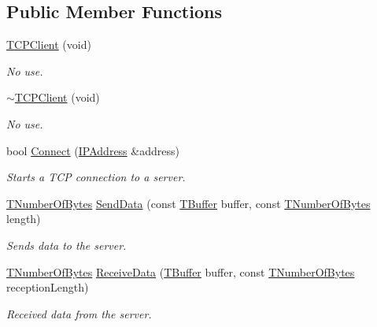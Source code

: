 \subsection*{Public Member Functions}
\begin{DoxyCompactItemize}
\item 
\hyperlink{class_t_c_p_client_a091bd16baee06d0c980062a442b2c1c4}{T\-C\-P\-Client} (void)
\begin{DoxyCompactList}\small\item\em No use. \end{DoxyCompactList}\item 
\hyperlink{class_t_c_p_client_a2a31d81f04bfb18988d68cdd0da007e3}{$\sim$\-T\-C\-P\-Client} (void)
\begin{DoxyCompactList}\small\item\em No use. \end{DoxyCompactList}\item 
bool \hyperlink{class_t_c_p_client_af093afaf101502080174a55518070c8b}{Connect} (\hyperlink{class_i_p_address}{I\-P\-Address} \&address)
\begin{DoxyCompactList}\small\item\em Starts a T\-C\-P connection to a server. \end{DoxyCompactList}\item 
\hyperlink{class_socket_base_ac414903631491453b96e71c06c2c2e72}{T\-Number\-Of\-Bytes} \hyperlink{class_t_c_p_client_a6ed7eb539935dc08de06ca331e384241}{Send\-Data} (const \hyperlink{class_socket_base_a1557d64029a25c20b4c306b80efcc143}{T\-Buffer} buffer, const \hyperlink{class_socket_base_ac414903631491453b96e71c06c2c2e72}{T\-Number\-Of\-Bytes} length)
\begin{DoxyCompactList}\small\item\em Sends data to the server. \end{DoxyCompactList}\item 
\hyperlink{class_socket_base_ac414903631491453b96e71c06c2c2e72}{T\-Number\-Of\-Bytes} \hyperlink{class_t_c_p_client_a01ad319e429ac5f10120a503d0ce40a1}{Receive\-Data} (\hyperlink{class_socket_base_a1557d64029a25c20b4c306b80efcc143}{T\-Buffer} buffer, const \hyperlink{class_socket_base_ac414903631491453b96e71c06c2c2e72}{T\-Number\-Of\-Bytes} reception\-Length)
\begin{DoxyCompactList}\small\item\em Received data from the server. \end{DoxyCompactList}\end{DoxyCompactItemize}
